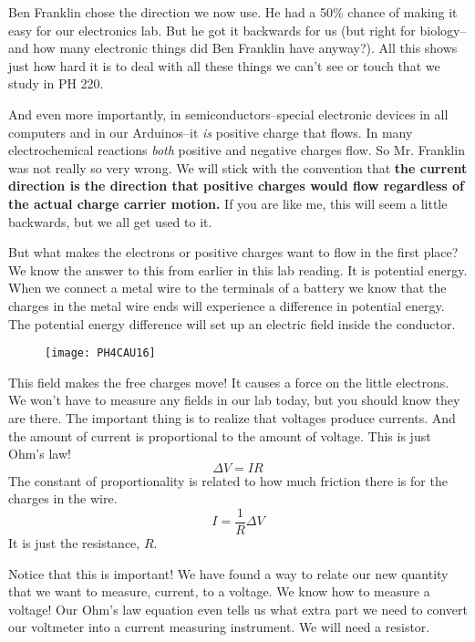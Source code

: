Ben Franklin chose the direction we now use. He had a 50\% chance of making
it easy for our electronics lab. But he got it backwards for us (but right
for biology--and how many electronic things did Ben Franklin have anyway?).
All this shows just how hard it is to deal with all these things we can't
see or touch that we study in PH 220.

And even more importantly, in semiconductors--special electronic devices in
all computers and in our Arduinos--it \emph{is} positive charge that flows.
In many electrochemical reactions \emph{both} positive and negative charges
flow. So Mr. Franklin was not really so very wrong. We will stick with the
convention that \textbf{the current direction is the direction that positive
charges would flow regardless of the actual charge carrier motion. }If you
are like me, this will seem a little backwards, but we all get used to it.

But what makes the electrons or positive charges want to flow in the first
place? We know the answer to this from earlier in this lab reading. It is
potential energy. When we connect a metal wire to the terminals of a battery
we know that the charges in the metal wire ends will experience a difference
in potential energy. The potential energy difference will set up an electric
field inside the conductor. \begin{figure}[h!]
\texttt{[image: PH4CAU16]}
\end{figure}

This field makes the free charges move! It causes a force on the little
electrons. We won't have to measure any fields in our lab today, but you
should know they are there. The important thing is to realize that voltages
produce currents. And the amount of current is proportional to the amount of
voltage. This is just Ohm's law! 
\begin{equation*}
\Delta V=IR
\end{equation*}%
The constant of proportionality is related to how much friction there is for
the charges in the wire.%
\begin{equation*}
I=\frac{1}{R}\Delta V
\end{equation*}%
It is just the resistance, $R$.\ 












Notice that this is important! We have found a way to relate our new
quantity that we want to measure, current, to a voltage. We know how to
measure a voltage! Our Ohm's law equation even tells us what extra part we
need to convert our voltmeter into a current measuring instrument. We will
need a resistor.

